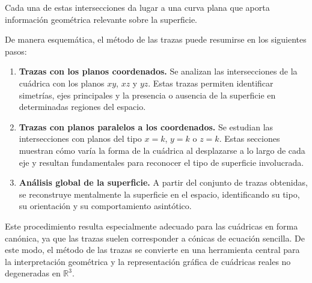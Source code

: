 \documentclass[11pt]{article}
\begin{document}
Cada una de estas intersecciones da lugar a una curva plana que aporta información geométrica relevante sobre la superficie.

\medskip

De manera esquemática, el método de las trazas puede resumirse en los siguientes pasos:

\begin{enumerate}
    \item \textbf{Trazas con los planos coordenados.}  
    Se analizan las intersecciones de la cuádrica con los planos $xy$, $xz$ y $yz$. Estas trazas permiten identificar simetrías, ejes principales y la presencia o ausencia de la superficie en determinadas regiones del espacio.

    \item \textbf{Trazas con planos paralelos a los coordenados.}  
    Se estudian las intersecciones con planos del tipo $x=k$, $y=k$ o $z=k$. Estas secciones muestran cómo varía la forma de la cuádrica al desplazarse a lo largo de cada eje y resultan fundamentales para reconocer el tipo de superficie involucrada.

    \item \textbf{Análisis global de la superficie.}  
    A partir del conjunto de trazas obtenidas, se reconstruye mentalmente la superficie en el espacio, identificando su tipo, su orientación y su comportamiento asintótico.
\end{enumerate}

Este procedimiento resulta especialmente adecuado para las cuádricas en forma canónica, ya que las trazas suelen corresponder a cónicas de ecuación sencilla. De este modo, el método de las trazas se convierte en una herramienta central para la interpretación geométrica y la representación gráfica de cuádricas reales no degeneradas en $\mathbb{R}^3$.
\end{document}
